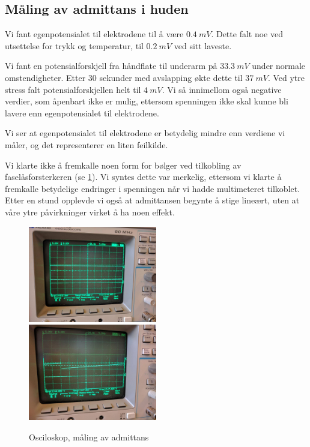 \documentclass[11pt,norsk]{article}
\begin{document}
\subsection{Måling av admittans i huden}
Vi fant egenpotensialet til elektrodene til å være $\SI{0.4}{mV}$. Dette falt noe ved utsettelse for trykk og temperatur, til $\SI{0.2}{mV}$ ved sitt laveste.

Vi fant en potensialforskjell fra håndflate til underarm på $\SI{33.3}{mV}$ under normale omstendigheter. Etter 30 sekunder med avslapping økte dette til $\SI{37}{mV}$. Ved ytre stress falt potensialforskjellen helt til $\SI{4}{mV}$. Vi så innimellom også negative verdier, som åpenbart ikke er mulig, ettersom spenningen ikke skal kunne bli lavere enn egenpotensialet til elektrodene.

Vi ser at egenpotensialet til elektrodene er betydelig mindre enn verdiene vi måler, og det representerer en liten feilkilde.

Vi klarte ikke å fremkalle noen form for bølger ved tilkobling av faselåsforsterkeren (se \ref{fig:picture1}). Vi syntes dette var merkelig, ettersom vi klarte å fremkalle betydelige endringer i spenningen når vi hadde multimeteret tilkoblet. Etter en stund opplevde vi også at admittansen begynte å stige lineært, uten at våre ytre påvirkninger virket å ha noen effekt.
\begin{figure}[H]
\includegraphics[width = 0.5\textwidth]{fig/picture2.jpg}
\includegraphics[width = 0.5\textwidth]{fig/picture1.jpg}
\caption{Osciloskop, måling av admittans}
\label{fig:picture1}
\end{figure}
\end{document}

